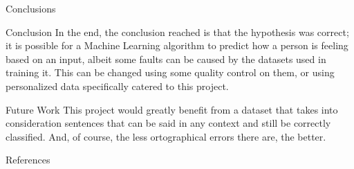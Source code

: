 \documentclass[11pt]{beamer}
\begin{document}
\begin{frame}{Conclusions}
	\begin{block}{Conclusion}
		In the end, the conclusion reached is that the hypothesis was correct; it is possible for a Machine Learning algorithm to predict how a person is feeling based on an input, albeit some faults can be caused by the datasets used in training it. This can be changed using some quality control on them, or using personalized data specifically catered to this project.
	\end{block}
	\begin{block}{Future Work}
		This project would greatly benefit from a dataset that takes into consideration sentences that can be said in any context and still be correctly classified. And, of course, the less ortographical errors there are, the better.
	\end{block}
\end{frame}


\begin{frame}[allowframebreaks]{References}
	\centering
		{\tiny }
	
\end{frame}
\end{document}
